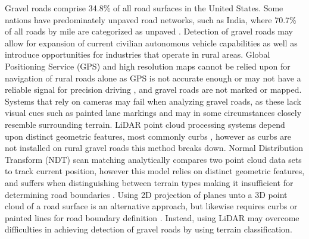 \documentclass[journal,onecolumn]{IEEEtran}
\begin{document}
	
	
	{Gravel roads comprise 34.8\% \cite{road_stats_2} of all road surfaces in the United States. Some nations have predominately unpaved road networks, such as India, where 70.7\% of all roads by mile are categorized as unpaved \cite{malik_lal_2019}. Detection of gravel roads may allow for expansion of current civilian autonomous vehicle capabilities as well as introduce opportunities for industries that operate in rural areas. Global Positioning Service (GPS) and high resolution maps cannot be relied upon for navigation of rural roads alone as GPS is not accurate enough or may not have a reliable signal for precision driving \cite{noauthor_gpsgov_nodate}, and gravel roads are not marked or mapped. Systems that rely on cameras may fail when analyzing gravel roads, as these lack visual cues such as painted lane markings \cite{crisman_scarf_1993} and may in some circumstances closely resemble surrounding terrain. LiDAR point cloud processing systems depend upon distinct geometric features, most commonly curbs \cite{yadav_extraction_2017,liu_new_2013,qiu_fast_2016,fernandes_road_2014,seker_experiments_nodate,yang_semi-automated_2013,miyazaki_line-based_2014,hervieu_road_2013,smadja_road_nodate}, however as curbs are not installed on rural gravel roads \cite{skorseth_gravel_nodate} this method breaks down. Normal Distribution Transform (NDT) scan matching analytically compares two point cloud data sets to track current position, however this model relies on distinct geometric features, and suffers when distinguishing between terrain types making it insufficient for determining road boundaries \cite{biber_normal_2003}. Using 2D projection of planes unto a 3D point cloud of a road surface is an alternative approach, but likewise requires curbs or painted lines for road boundary definition \cite{fernandes_road_2014, borkar_robust_2009-1, guo_lane_2015}. Instead, using LiDAR may overcome difficulties in achieving detection of gravel roads by using terrain classification.} 
	
\end{document}
